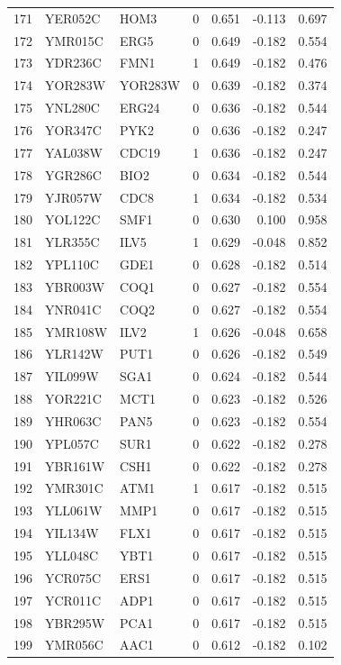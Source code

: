 \begin{longtable}{rllrrrr}
171 & YER052C & HOM3 & 0 & 0.651 & -0.113 & 0.697\\
172 & YMR015C & ERG5 & 0 & 0.649 & -0.182 & 0.554\\
173 & YDR236C & FMN1 & 1 & 0.649 & -0.182 & 0.476\\
174 & YOR283W & YOR283W & 0 & 0.639 & -0.182 & 0.374\\
175 & YNL280C & ERG24 & 0 & 0.636 & -0.182 & 0.544\\
176 & YOR347C & PYK2 & 0 & 0.636 & -0.182 & 0.247\\
177 & YAL038W & CDC19 & 1 & 0.636 & -0.182 & 0.247\\
178 & YGR286C & BIO2 & 0 & 0.634 & -0.182 & 0.544\\
179 & YJR057W & CDC8 & 1 & 0.634 & -0.182 & 0.534\\
180 & YOL122C & SMF1 & 0 & 0.630 & 0.100 & 0.958\\
181 & YLR355C & ILV5 & 1 & 0.629 & -0.048 & 0.852\\
182 & YPL110C & GDE1 & 0 & 0.628 & -0.182 & 0.514\\
183 & YBR003W & COQ1 & 0 & 0.627 & -0.182 & 0.554\\
184 & YNR041C & COQ2 & 0 & 0.627 & -0.182 & 0.554\\
185 & YMR108W & ILV2 & 1 & 0.626 & -0.048 & 0.658\\
186 & YLR142W & PUT1 & 0 & 0.626 & -0.182 & 0.549\\
187 & YIL099W & SGA1 & 0 & 0.624 & -0.182 & 0.544\\
188 & YOR221C & MCT1 & 0 & 0.623 & -0.182 & 0.526\\
189 & YHR063C & PAN5 & 0 & 0.623 & -0.182 & 0.554\\
190 & YPL057C & SUR1 & 0 & 0.622 & -0.182 & 0.278\\
191 & YBR161W & CSH1 & 0 & 0.622 & -0.182 & 0.278\\
192 & YMR301C & ATM1 & 1 & 0.617 & -0.182 & 0.515\\
193 & YLL061W & MMP1 & 0 & 0.617 & -0.182 & 0.515\\
194 & YIL134W & FLX1 & 0 & 0.617 & -0.182 & 0.515\\
195 & YLL048C & YBT1 & 0 & 0.617 & -0.182 & 0.515\\
196 & YCR075C & ERS1 & 0 & 0.617 & -0.182 & 0.515\\
197 & YCR011C & ADP1 & 0 & 0.617 & -0.182 & 0.515\\
198 & YBR295W & PCA1 & 0 & 0.617 & -0.182 & 0.515\\
199 & YMR056C & AAC1 & 0 & 0.612 & -0.182 & 0.102\\

\end{longtable}
